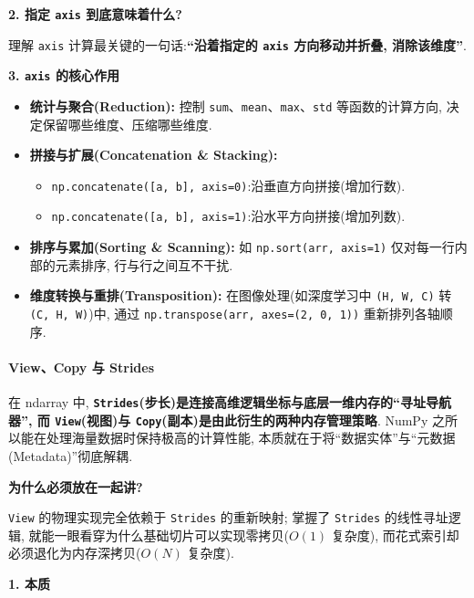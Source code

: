 \documentclass[11pt]{article}
\providecommand{\tightlist}{%
      \setlength{\itemsep}{0pt}\setlength{\parskip}{0pt}}
\begin{document}
\textbf{2. 指定 \texttt{axis} 到底意味着什么?}

理解 \texttt{axis} 计算最关键的一句话:\textbf{``沿着指定的 \texttt{axis}
方向移动并折叠, 消除该维度''}.

\textbf{3. \texttt{axis} 的核心作用}

\begin{itemize}
\tightlist
\item
  \textbf{统计与聚合(Reduction):} 控制
  \texttt{sum}、\texttt{mean}、\texttt{max}、\texttt{std}
  等函数的计算方向, 决定保留哪些维度、压缩哪些维度.
\item
  \textbf{拼接与扩展(Concatenation \& Stacking):}

  \begin{itemize}
  \tightlist
  \item
    \texttt{np.concatenate({[}a,\ b{]},\ axis=0)}:沿垂直方向拼接(增加行数).
  \item
    \texttt{np.concatenate({[}a,\ b{]},\ axis=1)}:沿水平方向拼接(增加列数).
  \end{itemize}
\item
  \textbf{排序与累加(Sorting \& Scanning):} 如
  \texttt{np.sort(arr,\ axis=1)} 仅对每一行内部的元素排序,
  行与行之间互不干扰.
\item
  \textbf{维度转换与重排(Transposition):} 在图像处理(如深度学习中
  \texttt{(H,\ W,\ C)} 转 \texttt{(C,\ H,\ W)})中, 通过
  \texttt{np.transpose(arr,\ axes=(2,\ 0,\ 1))} 重新排列各轴顺序.
\end{itemize}

    \paragraph{View、Copy 与 Strides}\label{viewcopy-ux4e0e-strides}

    在 ndarray 中,
\textbf{\texttt{Strides}(步长)是连接高维逻辑坐标与底层一维内存的``寻址导航器'',
而 \texttt{View}(视图)与
\texttt{Copy}(副本)是由此衍生的两种内存管理策略}. NumPy
之所以能在处理海量数据时保持极高的计算性能,
本质就在于将``数据实体''与``元数据(Metadata)''彻底解耦.

\textbf{为什么必须放在一起讲?}

\texttt{View} 的物理实现完全依赖于 \texttt{Strides} 的重新映射; 掌握了
\texttt{Strides} 的线性寻址逻辑,
就能一眼看穿为什么基础切片可以实现零拷贝(\(O(1)\) 复杂度),
而花式索引却必须退化为内存深拷贝(\(O(N)\) 复杂度).

\textbf{1. 本质}
\end{document}
